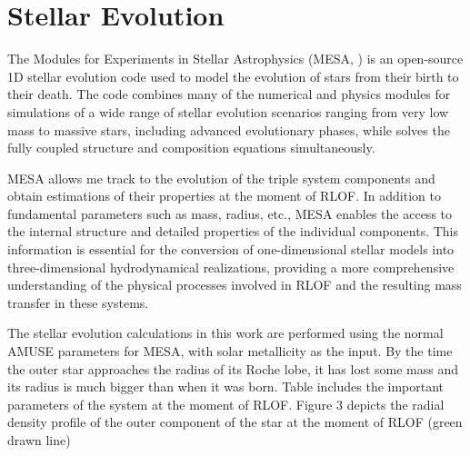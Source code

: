 \section{Stellar Evolution}

The Modules for Experiments in Stellar Astrophysics (MESA, \cite{paxton2010modules,paxton2013modules,paxton2015modules,paxton2019modules}) is an open-source 1D stellar evolution code used to model the evolution of stars from their birth to their death. The code combines many of the numerical and physics modules for simulations of a wide range of stellar evolution scenarios ranging from very low mass to massive stars, including advanced evolutionary phases, while solves the fully coupled structure and composition equations simultaneously. 

MESA allows me track to the evolution of the triple system components and obtain estimations of their properties at the moment of RLOF. In addition to fundamental parameters such as mass, radius, etc., MESA enables the access to the internal structure and detailed properties of the individual components. This information is essential for the conversion of one-dimensional stellar models into three-dimensional hydrodynamical realizations, providing a more comprehensive understanding of the physical processes involved in RLOF and the resulting mass transfer in these systems.

The stellar evolution calculations in this work are performed using the normal AMUSE parameters for MESA, with solar metallicity as the input. By the time the outer star approaches the radius of its Roche lobe, it has lost some mass and its radius is much bigger than when it was born. Table includes the important parameters of the system at the moment of RLOF. Figure 3 depicts the radial density profile of the outer component of the star at the moment of RLOF (green drawn line)



